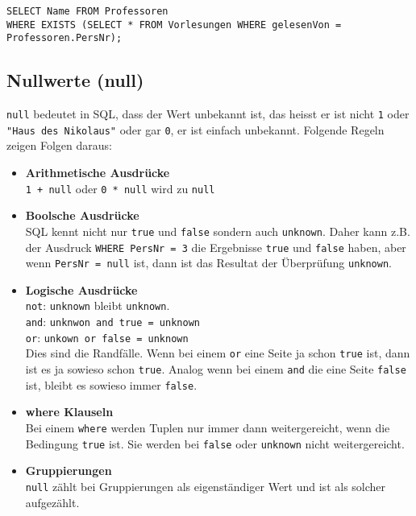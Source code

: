 \begin{lstlisting}[caption={SQL Beispiel mit Exists},label=lst:bsp_exists]
SELECT Name FROM Professoren
WHERE EXISTS (SELECT * FROM Vorlesungen WHERE gelesenVon = Professoren.PersNr);
\end{lstlisting}

\subsection{Nullwerte (null)}

\texttt{null} bedeutet in SQL, dass der Wert unbekannt ist, das heisst er ist nicht \texttt{1} oder \texttt{"Haus des Nikolaus"} oder gar \texttt{0}, er ist einfach unbekannt. Folgende Regeln zeigen Folgen daraus:

\begin{itemize}
  \item \textbf{Arithmetische Ausdrücke} \\
  \texttt{1 + null} oder \texttt{0 * null} wird zu \texttt{null}
  \item \textbf{Boolsche Ausdrücke} \\
  SQL kennt nicht nur \texttt{true} und \texttt{false} sondern auch \texttt{unknown}. Daher kann z.B. der Ausdruck \texttt{WHERE PersNr = 3} die Ergebnisse \texttt{true} und \texttt{false} haben, aber wenn \texttt{PersNr = null} ist, dann ist das Resultat der Überprüfung \texttt{unknown}.
  \item \textbf{Logische Ausdrücke} \\
  \texttt{not}: \texttt{unknown} bleibt \texttt{unknown}. \\
  \texttt{and}: \texttt{unknwon and true = unknown} \\
  \texttt{or}: \texttt{unkown or false = unknown} \\
  Dies sind die Randfälle. Wenn bei einem \texttt{or} eine Seite ja schon \texttt{true} ist, dann ist es ja sowieso schon \texttt{true}. Analog wenn bei einem \texttt{and} die eine Seite \texttt{false} ist, bleibt es sowieso immer \texttt{false}.
  \item \textbf{where Klauseln} \\
  Bei einem \texttt{where} werden Tuplen nur immer dann weitergereicht, wenn die Bedingung \texttt{true} ist. Sie werden bei \texttt{false} oder \texttt{unknown} nicht weitergereicht.
  \item \textbf{Gruppierungen} \\
  \texttt{null} zählt bei Gruppierungen als eigenständiger Wert und ist als solcher aufgezählt.
\end{itemize}

